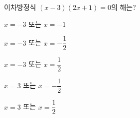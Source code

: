 이차방정식 $(x-3)(2x+1)=0$의 해는?
\begin{choicesii}{\rule[-3ex]{0pt}{8ex}$x=-3$ 또는 $x=-1$}{\rule[-3ex]{0pt}{8ex}$x=-3$ 또는 $x=-\dfrac{1}{2}$}{\rule[-3ex]{0pt}{8ex}$x=-3$ 또는 $x=\dfrac{1}{2}$}{\rule[-3ex]{0pt}{8ex}$x=3$ 또는 $x=-\dfrac{1}{2}$}{\rule[-3ex]{0pt}{8ex}$x=3$ 또는 $x=\dfrac{1}{2}$}\end{choicesii}
